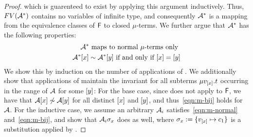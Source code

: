 \begin{proof}
which is guarenteed to exist by applying this argument inductively.
Thus, $FV( \mathcal{A}^\ast )$ contains no variables of infinite type,
and consequently $\mathcal{A}^\ast$ is a mapping from the equivalence classes of $\mathsf{F}$ to closed $\mu$-terms.
We further argue that $\mathcal{A}^\ast$ has the following properties:
\begin{eqnarray}
\label{eqn:m-normal} 
\mathcal{A}^\ast \text{ maps to normal $\mu$-terms only } \\
\label{eqn:m-bij} 
\mathcal{A}^\ast [ x ] \sim \mathcal{A}^\ast [ y ] \text{ if and only if } [ x ] = [ y ]
\end{eqnarray}
We show this by induction on the number of applications of .
We additionally show that applications of  maintain the invariant 
for all subterms $\mu v_{[ x ]}. t$ occurring in the range of $\mathcal{A}$ for some $[ y ]$:
For the base case, since  does not apply to $\mathsf{F}$,
we have that $\mathcal{A} [ x ] \not\sim \mathcal{A} [ y ]$ for all distinct $[ x ]$ and $[ y ]$,
and thus~\ref{eqn:m-bij} holds for $\mathcal{A}$.
For the inductive case, we assume an arbitrary $\mathcal{A}_i$ satisfies~\ref{eqn:m-normal} and~\ref{eqn:m-bij},
and show that $\mathcal{A}_i \sigma_x$ does as well, where $\sigma_x := \{ v_{[ x ]} \mapsto c_1 \}$ is a substitution applied by .

\end{proof}
